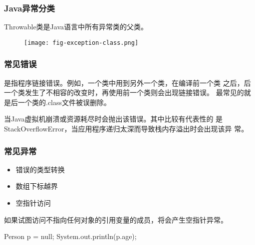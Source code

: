 \begin{frame}[fragile] %
  \frametitle{Java异常分类}

  {\hei\Red Throwable类是Java语言中所有异常类的父类。}

  \begin{figure}
    \centering
    \texttt{[image: fig-exception-class.png]}
  \end{figure}
\end{frame}

\begin{frame}[fragile] %
  \frametitle{常见错误}


  是指程序链接错误。{\kai 例如，一个类中用到另外一个类，在编译前一个类
    之后，后一个类发生了不相容的改变时，再使用前一个类则会出现链接错误。
    最常见的就是后一个类的.class文件被误删除。}

  \pause


  当Java虚拟机崩溃或资源耗尽时会抛出该错误。其中比较有代表性的
  是StackOverflowError，当应用程序递归太深而导致栈内存溢出时会出现该异
  常。


\end{frame}

\begin{frame}[fragile] %
  \frametitle{常见异常}
  
  
  \begin{itemize}
  \item 错误的类型转换
  \item 数组下标越界
  \item 空指针访问
  \end{itemize}


  如果试图访问不指向任何对象的引用变量的成员，将会产生空指针异常。
  
  \begin{javaCode}
    Person p = null;
    System.out.println(p.age);  
  \end{javaCode}
  
\end{frame}


